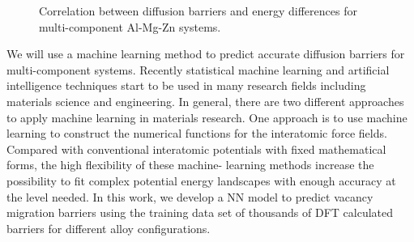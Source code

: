 \begingroup
\begin{figure}[!ht]
  \centering
\caption[Correlation between diffusion barriers and energy differences for multi-component Al-Mg-Zn systems]{Correlation between diffusion barriers and energy differences for multi-component Al-Mg-Zn systems.}
  \label{Chap:Al/Vac:fig2}
\end{figure}
\endgroup


We will use a machine learning method to predict accurate diffusion barriers for multi-component systems. Recently statistical machine learning and artificial intelligence techniques start to be used in many research fields including materials science and engineering. In general, there are two different approaches to apply machine learning in materials research. One approach is to use machine learning to construct the numerical functions for the interatomic force fields. \cite{bartok2010gaussian,behler2011atom,szlachta2014accuracy,artrith2016implementation,mehta2014exact,artrith2017efficient} Compared with conventional interatomic potentials with fixed mathematical forms, the high flexibility of these machine- learning methods increase the possibility to fit complex potential energy landscapes with enough accuracy at the level needed. In this work, we develop a \ac{NN} model to predict vacancy migration barriers using the training data set of thousands of \ac{DFT} calculated barriers for different alloy configurations. 


